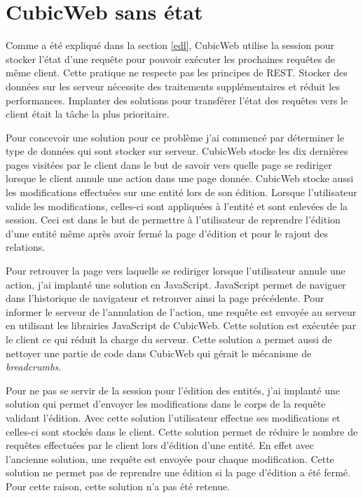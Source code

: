 \section{CubicWeb sans état}
Comme a été expliqué dans la section \ref{edl}, CubicWeb utilise la session pour stocker l'état d'une requête pour pouvoir exécuter les prochaines requêtes de même client. Cette pratique ne respecte pas les principes de REST. Stocker des données sur les serveur nécessite des traitements supplémentaires et réduit les performances. Implanter des solutions pour transférer l'état des requêtes vers le client était la tâche la plus prioritaire.

Pour concevoir une solution pour ce problème j'ai commencé par déterminer le type de données qui sont stocker sur serveur. CubicWeb stocke les dix dernières pages visitées par le client dans le but de savoir vers quelle page se rediriger lorsque le client annule une action dans une page donnée. CubicWeb stocke aussi les modifications effectuées sur une entité lors de son édition. Lorsque l'utilisateur valide les modifications, celles-ci sont appliquées à l'entité et sont enlevées de la session. Ceci est dans le but de permettre à l'utilisateur de reprendre l'édition d'une entité même après avoir fermé la page d'édition et pour le rajout des relations. 

Pour retrouver la page vers laquelle se rediriger lorsque l'utilisateur annule une action, j'ai implanté une solution en JavaScript. JavaScript permet de naviguer dans l'historique de navigateur et retrouver ainsi la page précédente. Pour informer le serveur de l'annulation de l'action, une requête  est envoyée au serveur en utilisant les librairies JavaScript de CubicWeb. Cette solution est exécutée par le client ce qui réduit la charge du serveur. Cette solution a permet aussi de nettoyer une partie de code dans CubicWeb qui gérait le mécanisme de \textit{breadcrumbs}.

Pour ne pas se servir de la session pour l'édition des entités, j'ai implanté une solution qui permet d'envoyer les modifications dans le corps de la requête validant l'édition. Avec cette solution l'utilisateur effectue ses modifications et celles-ci sont stockés dans le client. Cette solution permet de réduire le nombre de requêtes effectuées par le client lors d'édition d'une entité. En effet avec l'ancienne solution, une requête est envoyée pour chaque modification. Cette solution ne permet pas de reprendre une édition si la page d'édition a été fermé. Pour cette raison, cette solution n'a pas été retenue.

